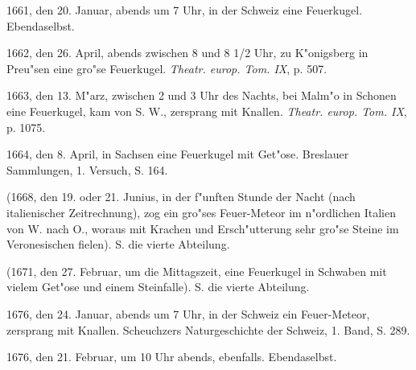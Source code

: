 \documentclass[a4paper, 11pt, oneside, polutonikogreek, german]{article}
\begin{document}
1661, den 20. Januar, abends um 7 Uhr, in der Schweiz eine Feuerkugel. Ebendaselbst.

1662, den 26. April, abends zwischen 8 und 8 1/2 Uhr, zu K"onigsberg in Preu"sen eine gro"se Feuerkugel. \emph{Theatr. europ. Tom. IX}, p. 507.

1663, den 13. M"arz, zwischen 2 und 3 Uhr des Nachts, bei Malm"o in Schonen eine Feuerkugel, kam von S. W., zersprang mit Knallen. \emph{Theatr. europ. Tom. IX}, p. 1075.

1664, den 8. April, in Sachsen eine Feuerkugel mit Get"ose. Breslauer Sammlungen, 1. Versuch, S. 164.

(1668, den 19. oder 21. Junius, in der f"unften Stunde der Nacht (nach italienischer Zeitrechnung), zog ein gro"ses Feuer-Meteor im n"ordlichen Italien von W. nach O., woraus mit Krachen und Ersch"utterung sehr gro"se Steine im Veronesischen fielen). S. die vierte Abteilung.

(1671, den 27. Februar, um die Mittagszeit, eine Feuerkugel in Schwaben mit vielem Get"ose und einem Steinfalle). S. die vierte Abteilung.

1676, den 24. Januar, abends um 7 Uhr, in der Schweiz ein Feuer-Meteor, zersprang mit Knallen. Scheuchzers Naturgeschichte der Schweiz, 1. Band, S. 289.

1676, den 21. Februar, um 10 Uhr abends, ebenfalls. Ebendaselbst.
\end{document}
